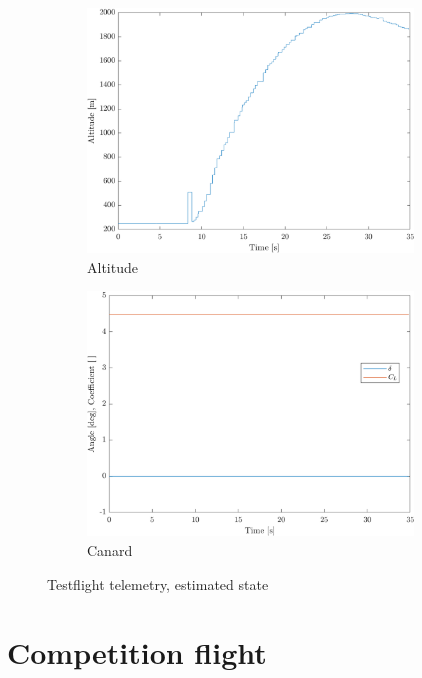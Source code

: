 \begin{figure}[ht]
\begin{subfigure}{0.49\textwidth}
        \includegraphics[width=0.95\textwidth]{images-results/testflight_alt.png}
        \caption{Altitude}
        \label{fig:testflight-alt}
    \end{subfigure}
    \begin{subfigure}{0.49\textwidth}
        \includegraphics[width=0.95\textwidth]{images-results/testflight_canard.png}
        \caption{Canard}
        \label{fig:testflight-canard}
    \end{subfigure}
    \caption{Testflight telemetry, estimated state}
    \label{fig:testflight}
\end{figure}

\clearpage
\section{Competition flight}
